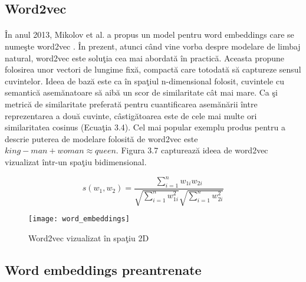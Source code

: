 \subsection{Word2vec}

\paragraph{}
\^ In anul 2013, Mikolov et al. a propus un model pentru word embeddings care se nume\c ste word2vec \cite{DBLP:journals/corr/MikolovSCCD13}. \^ In prezent, atunci c\^ and vine vorba despre modelare de limbaj natural, word2vec este solu\c tia cea mai abordat\u a \^ in practic\u a. Aceasta propune folosirea unor vectori de lungime fix\u a, compact\u a care totodat\u a s\u a captureze sensul cuvintelor. Ideea de baz\u a este ca \^ in spa\c tiul n-dimensional folosit, cuvintele cu semantic\u a asem\u anatoare s\u a aib\u a un scor de similaritate c\^at mai mare. Ca \c si metric\u a de similaritate preferat\u a pentru cuantificarea asem\u an\u arii \^ intre reprezentarea a dou\u a cuvinte, c\^ astig\u atoarea este de cele mai multe ori similaritatea cosinus (Ecua\c tia 3.4). Cel mai popular exemplu produs pentru a descrie puterea de modelare folosit\u a de word2vec este \(king - man + woman \approx queen\). Figura 3.7 captureaz\u a ideea de word2vec vizualizat \^ intr-un spa\c tiu bidimensional.

\begin{equation}
s(w_{1}, w_{2}) = \frac{\sum_{i=1}^{n}w_{1i}w_{2i}}{\sqrt{\sum_{i=1}^{n}w_{1i}^{2}}\sqrt{\sum_{i=1}^{n}w_{2i}^{2}}}
\end{equation}

\begin{figure}[H]
\centering
\texttt{[image: word\_embeddings]}
\caption{Word2vec vizualizat \^ in spa\c tiu 2D \cite{word-embeddings}}
\end{figure} 

\subsection{Word embeddings preantrenate}

